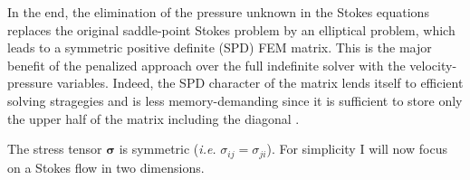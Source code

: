 In the end, the elimination of the pressure unknown in the Stokes equations
replaces the original saddle-point Stokes problem \cite{begl05} by an elliptical problem, 
which leads to a symmetric positive definite (SPD) FEM matrix. 
This is the major benefit of the penalized approach 
over the full indefinite solver with the velocity-pressure variables. Indeed, the SPD character of the matrix lends itself 
to efficient solving stragegies and is less memory-demanding since it is sufficient to store only the upper half of the matrix including the diagonal
\cite{gova}
.

The stress tensor ${\bm \sigma}$ is symmetric ({\it i.e.} $\sigma_{ij}=\sigma_{ji}$). For simplicity
I will now focus on a Stokes flow in two dimensions. 

